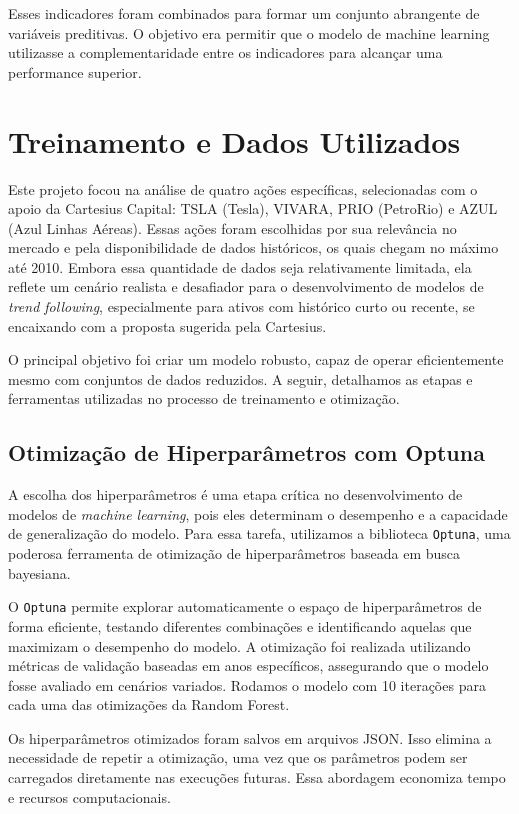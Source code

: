 \documentclass{article}
\begin{document}
Esses indicadores foram combinados para formar um conjunto abrangente de variáveis preditivas. O objetivo era permitir que o modelo de machine learning utilizasse a complementaridade entre os indicadores para alcançar uma performance superior.

\newpage

\section{Treinamento e Dados Utilizados}

Este projeto focou na análise de quatro ações específicas, selecionadas com o apoio da Cartesius Capital: TSLA (Tesla), VIVARA, PRIO (PetroRio) e AZUL (Azul Linhas Aéreas). Essas ações foram escolhidas por sua relevância no mercado e pela disponibilidade de dados históricos, os quais chegam no máximo até 2010. Embora essa quantidade de dados seja relativamente limitada, ela reflete um cenário realista e desafiador para o desenvolvimento de modelos de \textit{trend following}, especialmente para ativos com histórico curto ou recente, se encaixando com a proposta sugerida pela Cartesius.

O principal objetivo foi criar um modelo robusto, capaz de operar eficientemente mesmo com conjuntos de dados reduzidos. A seguir, detalhamos as etapas e ferramentas utilizadas no processo de treinamento e otimização.

\subsection{Otimização de Hiperparâmetros com Optuna}

A escolha dos hiperparâmetros é uma etapa crítica no desenvolvimento de modelos de \textit{machine learning}, pois eles determinam o desempenho e a capacidade de generalização do modelo. Para essa tarefa, utilizamos a biblioteca \texttt{Optuna}, uma poderosa ferramenta de otimização de hiperparâmetros baseada em busca bayesiana.

O \texttt{Optuna} permite explorar automaticamente o espaço de hiperparâmetros de forma eficiente, testando diferentes combinações e identificando aquelas que maximizam o desempenho do modelo. A otimização foi realizada utilizando métricas de validação baseadas em anos específicos, assegurando que o modelo fosse avaliado em cenários variados. Rodamos o modelo com 10 iterações para cada uma das otimizações da Random Forest.

Os hiperparâmetros otimizados foram salvos em arquivos JSON. Isso elimina a necessidade de repetir a otimização, uma vez que os parâmetros podem ser carregados diretamente nas execuções futuras. Essa abordagem economiza tempo e recursos computacionais.
\end{document}
